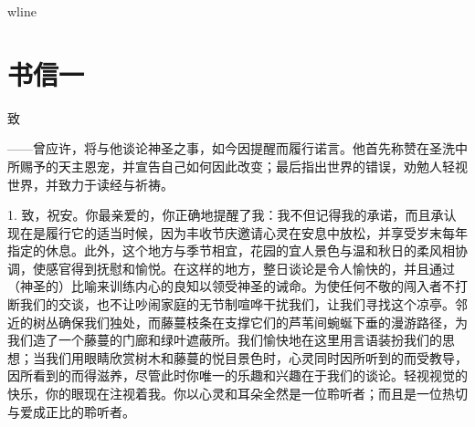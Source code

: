 wline{}\newline{}\newline{}\newline{}\newline{}\newline{}\newline{}\newline{}\newline{}\newline{}\newline{}\newline{}\newline{}\newline{}\newline{}\newline{}\newline{}\newline{}\par



\section{书信一}

致\par

——曾应许，将与他谈论神圣之事，如今因提醒而履行诺言。他首先称赞在圣洗中所赐予的天主恩宠，并宣告自己如何因此改变；最后指出世界的错误，劝勉人轻视世界，并致力于读经与祈祷。\par

1. 致，祝安。你最亲爱的，你正确地提醒了我：我不但记得我的承诺，而且承认现在是履行它的适当时候，因为丰收节庆邀请心灵在安息中放松，并享受岁末每年指定的休息。此外，这个地方与季节相宜，花园的宜人景色与温和秋日的柔风相协调，使感官得到抚慰和愉悦。在这样的地方，整日谈论是令人愉快的，并且通过（神圣的）比喻来训练内心的良知以领受神圣的诫命。为使任何不敬的闯入者不打断我们的交谈，也不让吵闹家庭的无节制喧哗干扰我们，让我们寻找这个凉亭。邻近的树丛确保我们独处，而藤蔓枝条在支撑它们的芦苇间蜿蜒下垂的漫游路径，为我们造了一个藤蔓的门廊和绿叶遮蔽所。我们愉快地在这里用言语装扮我们的思想；当我们用眼睛欣赏树木和藤蔓的悦目景色时，心灵同时因所听到的而受教导，因所看到的而得滋养，尽管此时你唯一的乐趣和兴趣在于我们的谈论。轻视视觉的快乐，你的眼现在注视着我。你以心灵和耳朵全然是一位聆听者；而且是一位热切与爱成正比的聆听者。\par

